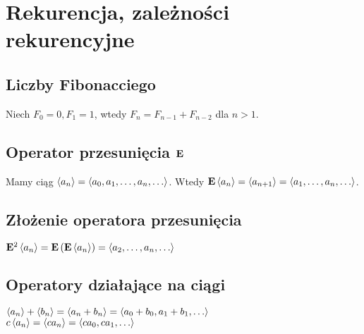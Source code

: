 \section{Rekurencja, zależności rekurencyjne}

\subsection*{Liczby Fibonacciego}
Niech $F_0 = 0, F_1 = 1$, wtedy $F_n = F_{n-1} + F_{n-2}$ dla $n > 1$.

\subsection*{Operator przesunięcia $\mathbf{E}$}
Mamy ciąg $\left\langle a_n \right\rangle = \left\langle a_0, a_1, \ldots, a_n, \ldots \right\rangle$. Wtedy
$\mathbf{E} \left\langle a_n \right\rangle = \left\langle a_{n+1} \right\rangle = \left\langle a_1, \ldots, a_n, \ldots \right\rangle$.

\subsection*{Złożenie operatora przesunięcia}
$\mathbf{E}^2 \left\langle a_n \right\rangle = \mathbf{E} \left( \mathbf{E} \left\langle a_n \right\rangle \right)
= \left\langle a_2, \ldots, a_n, \ldots \right\rangle$

\subsection*{Operatory działające na ciągi}
$\left\langle a_n \right\rangle + \left\langle b_n \right\rangle = \left\langle a_n + b_n \right\rangle = \left\langle a_0 + b_0, 
a_1 + b_1, \ldots \right\rangle$ \\
$c \left\langle a_n \right\rangle = \left\langle c a_n \right\rangle = \left\langle ca_0, ca_1, \ldots \right\rangle$